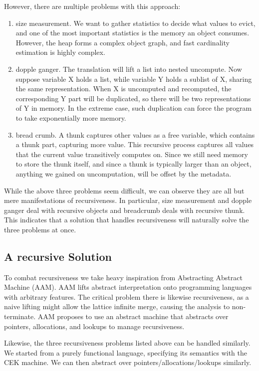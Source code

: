 However, there are multiple problems with this approach:
\begin{enumerate}
    \item size measurement. We want to gather statistics to decide what values to evict, and one of the most important statistics is the memory an object consumes. However, the heap forms a complex object graph, and fast cardinality estimation is highly complex.
    \item dopple ganger. The translation will lift a list into nested uncompute. Now suppose variable X holds a list, while variable Y holds a sublist of X, sharing the same representation. When X is uncomputed and recomputed, the corresponding Y part will be duplicated, so there will be two representations of Y in memory. In the extreme case, such duplication can force the program to take exponentially more memory. 
    \item bread crumb. A thunk captures other values as a free variable, which contains a thunk part, capturing more value. This recursive process captures all values that the current value transitively computes on. Since we still need memory to store the thunk itself, and since a thunk is typically larger than an object, anything we gained on uncomputation, will be offset by the metadata.
\end{enumerate}

While the above three problems seem difficult, we can observe they are all but mere manifestations of recursiveness. In particular, size measurement and dopple ganger deal with recursive objects and breadcrumb deals with recursive thunk. This indicates that a solution that handles recursiveness will naturally solve the three problems at once.

\subsection{A recursive Solution}
To combat recursiveness we take heavy inspiration from Abstracting Abstract Machine (AAM). AAM lifts abstract interpretation onto programming languages with arbitrary features. The critical problem there is likewise recursiveness, as a naive lifting might allow the lattice infinite merge, causing the analysis to non-terminate. AAM proposes to use an abstract machine that abstracts over pointers, allocations, and lookups to manage recursiveness.

Likewise, the three recursiveness problems listed above can be handled similarly. We started from a purely functional language, specifying its semantics with the CEK machine. We can then abstract over pointers/allocations/lookups similarly.

